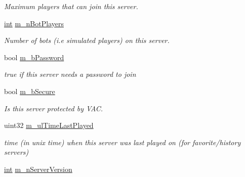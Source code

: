 \begin{DoxyCompactItemize}
\begin{DoxyCompactList}\small\item\em Maximum players that can join this server. \end{DoxyCompactList}\item 
\hypertarget{classgameserveritem__t_aadadb40a792ad18178e76d5b6b1dc909}{}\hyperlink{SDL__thread_8h_a6a64f9be4433e4de6e2f2f548cf3c08e}{int} \hyperlink{classgameserveritem__t_aadadb40a792ad18178e76d5b6b1dc909}{m\+\_\+n\+Bot\+Players}\label{classgameserveritem__t_aadadb40a792ad18178e76d5b6b1dc909}

\begin{DoxyCompactList}\small\item\em Number of bots (i.\+e simulated players) on this server. \end{DoxyCompactList}\item 
\hypertarget{classgameserveritem__t_a2c9ff8bc276f576d63f8850288aa06cc}{}bool \hyperlink{classgameserveritem__t_a2c9ff8bc276f576d63f8850288aa06cc}{m\+\_\+b\+Password}\label{classgameserveritem__t_a2c9ff8bc276f576d63f8850288aa06cc}

\begin{DoxyCompactList}\small\item\em true if this server needs a password to join \end{DoxyCompactList}\item 
\hypertarget{classgameserveritem__t_a3e4cc5a7f31facaf4218329a00888600}{}bool \hyperlink{classgameserveritem__t_a3e4cc5a7f31facaf4218329a00888600}{m\+\_\+b\+Secure}\label{classgameserveritem__t_a3e4cc5a7f31facaf4218329a00888600}

\begin{DoxyCompactList}\small\item\em Is this server protected by V\+A\+C. \end{DoxyCompactList}\item 
\hypertarget{classgameserveritem__t_a2ba4be71a125c17e9f7dfb4443895f6b}{}uint32 \hyperlink{classgameserveritem__t_a2ba4be71a125c17e9f7dfb4443895f6b}{m\+\_\+ul\+Time\+Last\+Played}\label{classgameserveritem__t_a2ba4be71a125c17e9f7dfb4443895f6b}

\begin{DoxyCompactList}\small\item\em time (in unix time) when this server was last played on (for favorite/history servers) \end{DoxyCompactList}\item 
\hypertarget{classgameserveritem__t_a1e6dbc6ed4bb005fc549fae132779b3f}{}\hyperlink{SDL__thread_8h_a6a64f9be4433e4de6e2f2f548cf3c08e}{int} \hyperlink{classgameserveritem__t_a1e6dbc6ed4bb005fc549fae132779b3f}{m\+\_\+n\+Server\+Version}\label{classgameserveritem__t_a1e6dbc6ed4bb005fc549fae132779b3f}


\end{DoxyCompactItemize}
